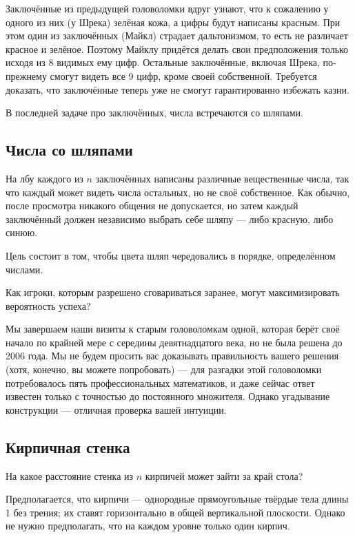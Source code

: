 Заключённые из предыдущей головоломки вдруг узнают, что к сожалению у одного из них (у Шрека) зелёная кожа,
а цифры будут написаны красным.
При этом один из заключённых (Майкл) страдает дальтонизмом, то есть не различает красное и зелёное.
Поэтому Майклу придётся делать свои предположения только исходя из 8 видимых ему цифр.
Остальные заключённые, включая Шрека, по-прежнему смогут видеть все 9 цифр, кроме своей собственной.
Требуется доказать, что заключённые теперь уже не смогут гарантированно избежать казни.

\medskip

В последней задаче про заключённых, числа встречаются со шляпами. 

\subsection*{Числа со шляпами}

На лбу каждого из $n$ заключённых написаны различные вещественные числа, так что каждый может видеть числа остальных, но не своё собственное.
Как обычно, после просмотра никакого общения не допускается, но затем каждый заключённый должен независимо выбрать себе шляпу --- либо красную, либо синюю.

Цель состоит в том, чтобы цвета шляп чередовались в порядке, определённом числами.

Как игроки, которым разрешено сговариваться заранее, могут максимизировать вероятность успеха?

\medskip

Мы завершаем наши визиты к старым головоломкам одной, которая берёт своё начало по крайней мере с середины девятнадцатого века, но не была решена до 2006 года.
Мы не будем просить вас доказывать правильность вашего решения (хотя, конечно, вы можете попробовать) --- для разгадки этой головоломки потребовалось пять профессиональных математиков, и даже сейчас ответ известен только с точностью до постоянного множителя.
Однако угадывание конструкции --- отличная проверка вашей интуиции.

\subsection*{Кирпичная стенка}\label{Кирпичная стенка}

На какое расстояние стенка из $n$ кирпичей может зайти за край стола?

 Предполагается, что кирпичи --- однородные прямоугольные твёрдые тела длины 1 без трения;
их ставят горизонтально в общей вертикальной плоскости.
Однако не нужно предполагать, что на каждом уровне только один кирпич.
